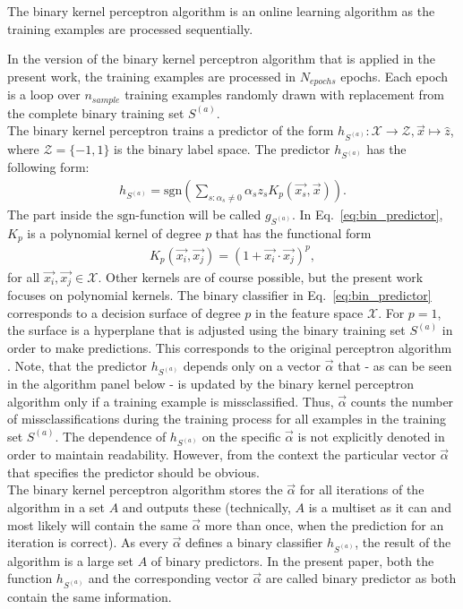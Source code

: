 The binary kernel perceptron algorithm is an online learning algorithm as the training examples are processed sequentially. 

In the version of the binary kernel perceptron algorithm that is applied in the present work, the training examples are processed in $N_{epochs}$ epochs. Each epoch is a loop over $n_{sample}$ training examples randomly drawn with replacement from the complete binary training set $S^{(a)}$.\\ 

The binary kernel perceptron trains a predictor of the form $h_{S^{(a)}}: \mathcal{X} \rightarrow \mathcal{Z}, \vec{x} \mapsto \hat{z}$, where $\mathcal{Z} = \{-1, 1\}$ is the binary label space. The predictor $h_{S^{(a)}}$ has the following form:
\begin{align}\label{eq:bin_predictor}
	h_{S^{(a)}} = \mathrm{sgn}\left( \sum_{s: \alpha_s \neq 0} \alpha_s z_s 	     	K_p(\vec{x_s}, \vec{x}) \right).
\end{align}
The part inside the $\mathrm{sgn}$-function will be called $g_{S^{(a)}}$. In Eq.~\ref{eq:bin_predictor}, $K_p$ is a polynomial kernel of degree $p$ that has the functional form
\begin{align*}
	K_p(\vec{x_i}, \vec{x_j}) = (1 + \vec{x_i} \cdot \vec{x_j})^p,
\end{align*}
for all $\vec{x_i}, \vec{x_j} \in \mathcal{X}$. Other kernels are of course possible, but the present work focuses on polynomial kernels. The binary classifier in Eq.~\ref{eq:bin_predictor} corresponds to a decision surface of degree $p$ in the feature space $\mathcal{X}$. For $p=1$, the surface is a hyperplane that is adjusted using the binary training set $S^{(a)}$ in order to make predictions. This corresponds to the original perceptron algorithm \cite{perceptron1957}. Note, that the predictor $h_{S^{(a)}}$ depends only on a vector $\vec{\alpha}$ that - as can be seen in the algorithm panel below - is updated by the binary kernel perceptron algorithm only if a training example is missclassified. Thus, $\vec{\alpha}$ counts the number of missclassifications during the training process for all examples in the training set $S^{(a)}$. The dependence of $h_{S^{(a)}}$ on the specific $\vec{\alpha}$ is not explicitly denoted in order to maintain readability. However, from the context the particular vector $\vec{\alpha}$ that specifies the predictor should be obvious.\\ 

The binary kernel perceptron algorithm stores the $\vec{\alpha}$ for all iterations of the algorithm in a set $A$ and outputs these (technically, $A$ is a multiset as it can and most likely will contain the same $\vec{\alpha}$ more than once, when the prediction for an iteration is correct). As every $\vec{\alpha}$ defines a binary classifier $h_{S^{(a)}}$, the result of the algorithm is a large set $A$ of binary predictors. In the present paper, both the function $h_{S^{(a)}}$ and the corresponding vector $\vec{\alpha}$ are called binary predictor as both contain the same information.\\

